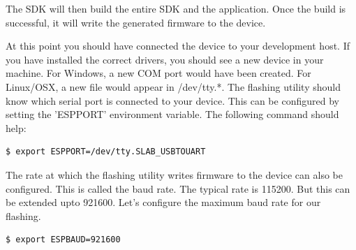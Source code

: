 \documentclass[main.tex]{subfiles}
\begin{document}
The SDK will then build the entire SDK and the application. Once the build is successful, it will write the generated firmware to the device.

At this point you should have connected the device to your development host. If you have installed the correct drivers, you should see a new device in your machine. For Windows, a new COM port would have been created. For Linux/OSX, a new file would appear in /dev/tty.*. The flashing utility should know which serial port is connected to your device. This can be configured by setting the 'ESPPORT' environment variable. The following command should help:
\begin{verbatim}
$ export ESPPORT=/dev/tty.SLAB_USBTOUART
\end{verbatim}

The rate at which the flashing utility writes firmware to the device can also be configured. This is called the baud rate. The typical rate is 115200. But this can be extended upto 921600. Let's configure the maximum baud rate for our flashing.
\begin{verbatim}
$ export ESPBAUD=921600
\end{verbatim}

\end{document}
